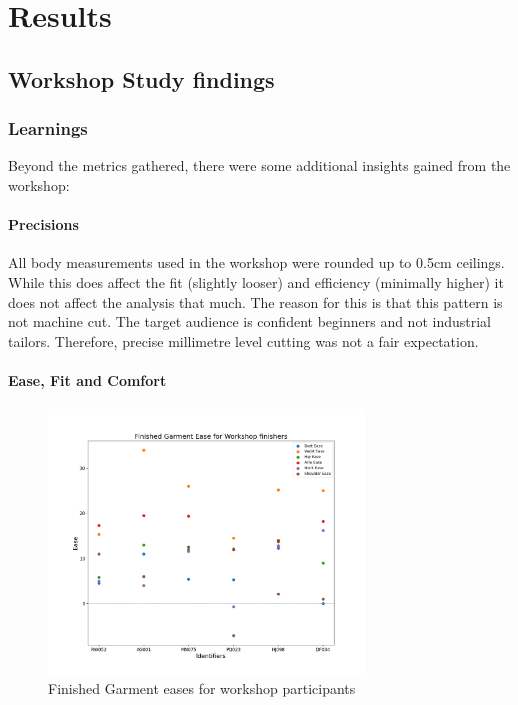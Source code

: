 \chapter{Results}


\section{Workshop Study findings} \label{sec:sections}

\subsection{Learnings}
Beyond the metrics gathered, there were some additional insights gained from the workshop:
\subsubsection{Precisions}
All body measurements used in the workshop were rounded up to 0.5cm ceilings. While this does affect the fit (slightly looser) and efficiency (minimally higher) it does not affect the analysis that much. The reason for this is that this pattern is not machine cut. The target audience is confident beginners and not industrial tailors. Therefore, precise millimetre level cutting was not a fair expectation.

\subsubsection{Ease, Fit and Comfort}
\begin{figure} [H] %
    \centering %
    \includegraphics[width = 0.75\textwidth]{Images/FG_Ease_Plot.png} %
    \caption{Finished Garment eases for workshop participants}
    \label{} %
\end{figure}

